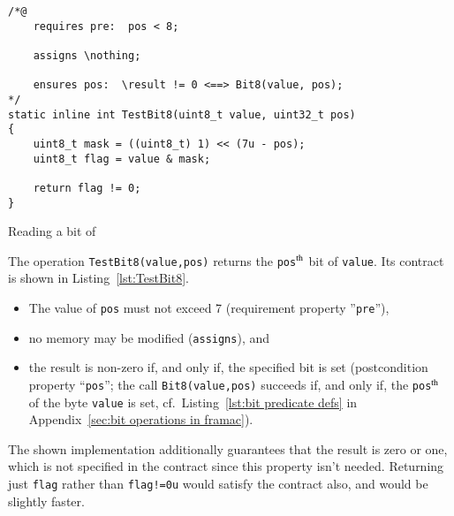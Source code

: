 \begin{listing}[hbt]
\begin{minipage}{0.99\textwidth}
\begin{lstlisting}[style=acsl-block]
/*@
    requires pre:  pos < 8;

    assigns \nothing;

    ensures pos:  \result != 0 <==> Bit8(value, pos);
*/
static inline int TestBit8(uint8_t value, uint32_t pos)
{
    uint8_t mask = ((uint8_t) 1) << (7u - pos);
    uint8_t flag = value & mask;

    return flag != 0;
}
\end{lstlisting}
\end{minipage}
\caption{\label{lst:TestBit8}Reading a bit of }
\end{listing}










The operation \lstinline{TestBit8(value,pos)} returns the
\lstinline{pos}$^{\mbox{\scriptsize th}}$
bit of \lstinline{value}.
%
Its contract is shown in Listing~\ref{lst:TestBit8}.
%
\begin{itemize}
\item The value of \lstinline{pos} must not exceed 7 
	(requirement property ''\lstinline{pre}''),
\item no memory may be modified (\lstinline{assigns}), and 
\item the result is non-zero if, and only
	if, the specified bit is set (postcondition property
	``\lstinline{pos}''; the call \lstinline{Bit8(value,pos)} succeeds 
	if, and only if, the \lstinline{pos}$^{\mbox{\scriptsize th}}$ of
	the byte \lstinline{value} is set, 
	cf.\ Listing~\ref{lst:bit predicate defs} in
	Appendix~\ref{sec:bit operations in framac}).
\end{itemize}
%
The shown implementation additionally guarantees that the result is
zero or one, which
is not specified in the contract since this property isn't needed.
%
Returning just \lstinline{flag} rather than \lstinline{flag!=0u}
would satisfy the
contract also, and would be slightly faster.






